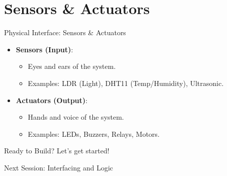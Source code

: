 \documentclass[aspectratio=169]{beamer}
\begin{document}
\section{Sensors \& Actuators}
\begin{frame}{Physical Interface: Sensors \& Actuators}
    \begin{itemize}
        \item \textbf{Sensors (Input)}: 
            \begin{itemize}
                \item Eyes and ears of the system.
                \item Examples: LDR (Light), DHT11 (Temp/Humidity), Ultrasonic.
            \end{itemize}
        \item \textbf{Actuators (Output)}: 
            \begin{itemize}
                \item Hands and voice of the system.
                \item Examples: LEDs, Buzzers, Relays, Motors.
            \end{itemize}
    \end{itemize}
\end{frame}

\begin{frame}{Ready to Build?}
    \centering
    \Huge \textcolor{IoTCyan}{Let's get started!}
    
    \vspace{1cm}
    \large \textcolor{IoTGrey}{Next Session: Interfacing and Logic}
\end{frame}
\end{document}
